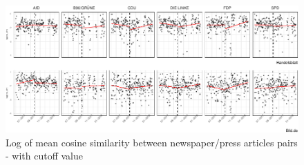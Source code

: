 \documentclass[
]{article}
\begin{document}
\begin{figure}

{\centering \includegraphics[width=0.9\linewidth]{main_text_files/figure-latex/Daily mean cosine similarity - rd example-1} 

}

\caption{Log of mean cosine similarity between newspaper/press articles pairs - with cutoff value \label{fig:mean_cosine_sim_rd_example}}\label{fig:Daily mean cosine similarity - rd example}
\end{figure}
\end{document}
